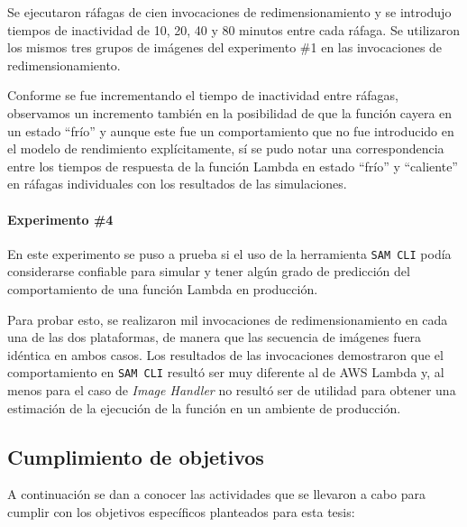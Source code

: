 Se ejecutaron ráfagas de cien invocaciones de redimensionamiento y se introdujo tiempos de inactividad de 10, 20, 40 y 80 minutos entre cada ráfaga. Se utilizaron los mismos tres grupos de imágenes del experimento \#1 en las invocaciones de redimensionamiento.

Conforme se fue incrementando el tiempo de inactividad entre ráfagas, observamos un incremento también en la posibilidad de que la función cayera en un estado ``frío'' y aunque este fue un comportamiento que no fue introducido en el modelo de rendimiento explícitamente, sí se pudo notar una correspondencia entre los tiempos de respuesta de la función Lambda en estado ``frío'' y ``caliente'' en ráfagas individuales con los resultados de las simulaciones.

\paragraph{Experimento \#4} En este experimento se puso a prueba si el uso de la herramienta \texttt{SAM CLI} podía considerarse confiable para simular y tener algún grado de predicción del comportamiento de una función Lambda en producción. 

Para probar esto, se realizaron mil invocaciones de redimensionamiento en cada una de las dos plataformas, de manera que las secuencia de imágenes fuera idéntica en ambos casos. Los resultados de las invocaciones demostraron que el comportamiento en \texttt{SAM CLI} resultó ser muy diferente al de AWS Lambda y, al menos para el caso de \emph{Image Handler} no resultó ser de utilidad para obtener una estimación de la ejecución de la función en un ambiente de producción.

\subsection{Cumplimiento de objetivos}
A continuación se dan a conocer las actividades que se llevaron a cabo para cumplir con los objetivos específicos planteados para esta tesis:


